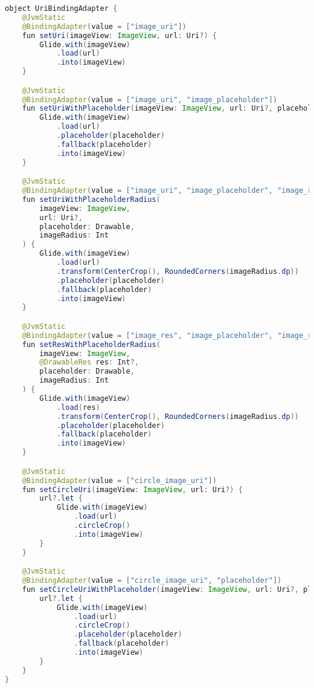 \begin{lstlisting}[language=Java,label={lst:favorites_images},caption={UriBindingAdapter}]
object UriBindingAdapter {
    @JvmStatic
    @BindingAdapter(value = ["image_uri"])
    fun setUri(imageView: ImageView, url: Uri?) {
        Glide.with(imageView)
            .load(url)
            .into(imageView)
    }

    @JvmStatic
    @BindingAdapter(value = ["image_uri", "image_placeholder"])
    fun setUriWithPlaceholder(imageView: ImageView, url: Uri?, placeholder: Drawable) {
        Glide.with(imageView)
            .load(url)
            .placeholder(placeholder)
            .fallback(placeholder)
            .into(imageView)
    }

    @JvmStatic
    @BindingAdapter(value = ["image_uri", "image_placeholder", "image_radius"])
    fun setUriWithPlaceholderRadius(
        imageView: ImageView,
        url: Uri?,
        placeholder: Drawable,
        imageRadius: Int
    ) {
        Glide.with(imageView)
            .load(url)
            .transform(CenterCrop(), RoundedCorners(imageRadius.dp))
            .placeholder(placeholder)
            .fallback(placeholder)
            .into(imageView)
    }

    @JvmStatic
    @BindingAdapter(value = ["image_res", "image_placeholder", "image_radius"])
    fun setResWithPlaceholderRadius(
        imageView: ImageView,
        @DrawableRes res: Int?,
        placeholder: Drawable,
        imageRadius: Int
    ) {
        Glide.with(imageView)
            .load(res)
            .transform(CenterCrop(), RoundedCorners(imageRadius.dp))
            .placeholder(placeholder)
            .fallback(placeholder)
            .into(imageView)
    }

    @JvmStatic
    @BindingAdapter(value = ["circle_image_uri"])
    fun setCircleUri(imageView: ImageView, url: Uri?) {
        url?.let {
            Glide.with(imageView)
                .load(url)
                .circleCrop()
                .into(imageView)
        }
    }

    @JvmStatic
    @BindingAdapter(value = ["circle_image_uri", "placeholder"])
    fun setCircleUriWithPlaceholder(imageView: ImageView, url: Uri?, placeholder: Drawable) {
        url?.let {
            Glide.with(imageView)
                .load(url)
                .circleCrop()
                .placeholder(placeholder)
                .fallback(placeholder)
                .into(imageView)
        }
    }
}
\end{lstlisting}

